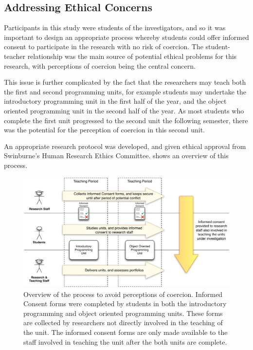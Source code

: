\subsection{Addressing Ethical Concerns} %
\label{sub:addressing_ethical_concerns}

Participants in this study were students of the investigators, and so it was important to design an appropriate process whereby students could offer informed consent to participate in the research with no risk of coercion. The student-teacher relationship was the main source of potential ethical problems for this research, with perceptions of coercion being the central concern. 

This issue is further complicated by the fact that the researchers may teach both the first and second programming units, for example students may undertake the introductory programming unit in the first half of the year, and the object oriented programming unit in the second half of the year. As most students who complete the first unit progressed to the second unit the following semester, there was the potential for the perception of coercion in this second unit.

An appropriate research protocol was developed, and given ethical approval from Swinburne's Human Research Ethics Committee.  shows an overview of this process. 

\begin{figure}[thb]
  \centering
  \includegraphics[width=\textwidth]{EthicsProcess}
  \caption{Overview of the process to avoid perceptions of coercion. Informed Consent forms were completed by students in both the introductory programming and object oriented programming units. These forms are collected by researchers not directly involved in the teaching of the unit. The informed consent forms are only made available to the staff involved in teaching the unit after the both units are complete.}
  \label{fig:ethics_process}
\end{figure}

